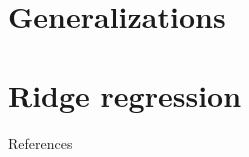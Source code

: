 \documentclass{beamer}
\numberwithin{equation}{section}
\begin{document}
\section{Generalizations}

\section{Ridge regression}

\begin{frame}{References}
    
    
\end{frame}
\end{document}
